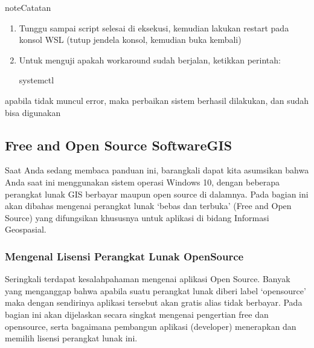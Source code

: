 \documentclass[letterpaper,10pt,english]{sphinxmanual}
\begin{document}
\begin{sphinxadmonition}{note}{Catatan}
\begin{enumerate}
\begin{sphinxVerbatim}[commandchars=\\\{\}]
 ubuntu\PYGZhy{}wsl2\PYGZhy{}systemd\PYGZhy{}script/
bash ubuntu\PYGZhy{}wsl2\PYGZhy{}systemd\PYGZhy{}script.sh
\end{sphinxVerbatim}

\item {} 
Tunggu sampai script selesai di eksekusi, kemudian lakukan restart pada konsol WSL (tutup jendela konsol, kemudian buka kembali)

\item {} 
Untuk menguji apakah workaround sudah berjalan, ketikkan perintah:

\begin{sphinxVerbatim}[commandchars=\\\{\}]
systemctl
\end{sphinxVerbatim}

\end{enumerate}

apabila tidak muncul error, maka perbaikan sistem berhasil dilakukan, dan  sudah bisa digunakan
\end{sphinxadmonition}


\subsection{Free and Open Source Software\sphinxhyphen{}GIS}
\label{\detokenize{sesi1/fossgis:free-and-open-source-software-gis}}\label{\detokenize{sesi1/fossgis::doc}}
Saat Anda sedang membaca panduan ini, barangkali dapat kita asumsikan bahwa Anda saat ini menggunakan sistem operasi Windows 10, dengan beberapa perangkat lunak GIS berbayar maupun open source di dalamnya. Pada bagian ini akan dibahas mengenai perangkat lunak ‘bebas dan terbuka’ (Free and Open Source) yang difungsikan khususnya untuk aplikasi di bidang Informasi Geospasial.


\subsubsection{Mengenal Lisensi Perangkat Lunak OpenSource}
\label{\detokenize{sesi1/fossgis:mengenal-lisensi-perangkat-lunak-opensource}}
Seringkali terdapat kesalah\sphinxhyphen{}pahaman mengenai aplikasi Open Source. Banyak yang menganggap bahwa apabila suatu perangkat lunak diberi label ‘opensource’ maka dengan sendirinya aplikasi tersebut akan gratis alias tidak berbayar. Pada bagian ini akan dijelaskan secara singkat mengenai pengertian free dan opensource, serta bagaimana pembangun aplikasi (developer) menerapkan dan memilih lisensi perangkat lunak ini.
\end{document}
